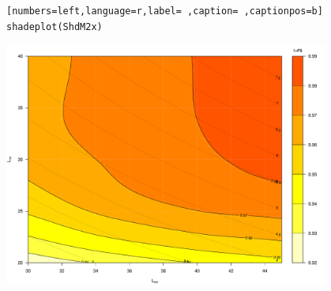 \begin{lstlisting}[numbers=left,language=r,label= ,caption= ,captionpos=b]
shadeplot(ShdM2x)
\end{lstlisting}

\begin{center}
\includegraphics[width=0.8\textwidth]{figuras/codigo-optimshd.pdf}
\end{center}
